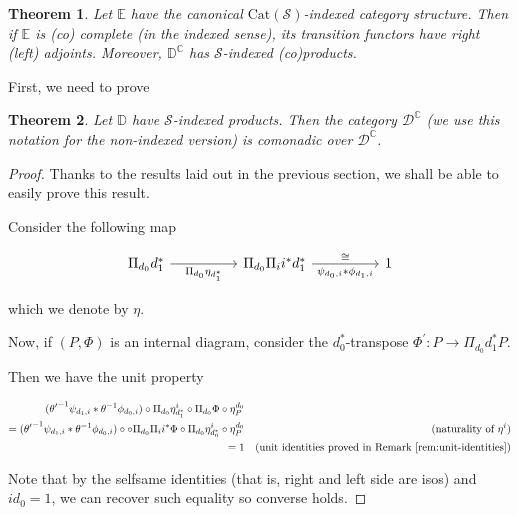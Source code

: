 \documentclass[10pt, oneside]{article}
\newtheorem{theorem}{Theorem}[section]
\begin{document}
\begin{theorem}
    Let $\mathbb{E}$ have the canonical $\mathrm{Cat}(\mathcal{S})$-indexed category structure. Then if $\mathbb{E}$ is (co) complete (in the indexed sense), its transition functors have right (left) adjoints. Moreover, $\mathbb{D}^\mathbb{C}$ has $\mathcal{S}$-indexed (co)products.
\end{theorem}

First, we need to prove

\begin{theorem}
    Let $\mathbb{D}$ have $\mathcal{S}$-indexed products. Then the category $\mathcal{D}^\mathbb{C}$ (we use this notation for the non-indexed version) is comonadic over $\mathcal{D}^\mathbb{C}$.
\end{theorem}
\begin{proof}
 Thanks to the results laid out in the previous section, we shall be able to easily prove this result.

   Consider the following map

    \[\begin{tikzcd}[ampersand replacement=\&]
	{\Pi_{d_0} d_1^\ast} \&\& {\Pi_{d_0} \Pi_{i} i^\ast d_1^\ast} \&\& 1
	\arrow["\cong", from=1-3, to=1-5]
	\arrow["{\psi_{d_0, i} \ast \phi_{d_1, i}}"', draw=none, from=1-3, to=1-5]
	\arrow["{\Pi_{d_0} \eta_{d_1^\ast}}"', from=1-1, to=1-3]
    \end{tikzcd}\]

\noindent which we denote by $\eta$.

Now, if $(P, \Phi)$ is an internal diagram, consider the $d_0^\ast$-transpose $\Phi^\prime: P \to \Pi_{d_0} d_1^\ast P$.

Then we have the unit property

\begin{align*}
    ({\theta^\prime}^{-1} \psi_{d_1, i} \ast \theta^{-1} \phi_{d_0, i}) \circ \Pi_{d_0} \eta^i_{d_1^\ast} \circ \Pi_{d_0} \Phi \circ \eta^{d_0}_P \\
    =  ({\theta^\prime}^{-1} \psi_{d_1, i} \ast \theta^{-1} \phi_{d_0, i}) \circ \circ \Pi_{d_0} \Pi_i i^\ast \Phi \circ \Pi_{d_0} \eta^i_{d_0^\ast} \circ \eta^{d_0}_P  && \text{(naturality of $\eta^i$)} \\
    = 1 && \text{(unit identities proved in Remark \ref{rem:unit-identities})}
\end{align*}

Note that by the selfsame identities (that is, right and left side are isos) and $id_0 = 1$, we can recover such equality so converse holds.


\end{proof}
\end{document}
